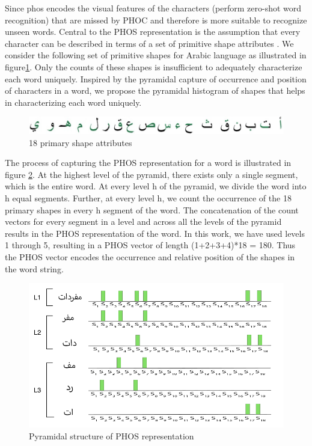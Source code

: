 Since \acrshort{phos} encodes the visual features of the characters (perform zero-shot word recognition) that are missed by PHOC and therefore is more suitable to recognize unseen words. Central to the PHOS representation is the assumption that every character can be described in terms of a set of primitive shape attributes \cite{ZEROSHOT}. We consider the following set of primitive shapes for Arabic language as illustrated in figure\ref{fig:arabic-primary-shape}. Only the counts of these shapes is insufficient to adequately characterize each word uniquely. Inspired by the pyramidal capture of occurrence and position of characters in a word, we propose the pyramidal histogram of shapes that helps in characterizing each word uniquely.

\begin{figure}[!htb]
    \centering
    \includegraphics[width=14cm]{images/arabic-letters.png}
    \caption{18 primary shape attributes}
    \label{fig:arabic-primary-shape}
\end{figure}


The process of capturing the PHOS representation for a word is illustrated in figure \ref{fig:phos-representation}. At the highest level of the pyramid, there exists only a single segment, which is the entire word. At every level h of the pyramid, we divide the word into h equal segments. Further, at every level h, we count the occurrence of the 18 primary shapes in every h segment of the word. The concatenation of the count vectors for every segment in a level and across all the levels of the pyramid results in the PHOS representation of the word. In this work, we have used levels 1 through 5, resulting in a PHOS vector of length (1+2+3+4)*18 = 180. Thus the PHOS vector encodes the occurrence and relative position of the shapes in the word string.

\begin{figure}[!htb]
    \centering
    \includegraphics[width=14cm]{images/phos_representation-arabic.png}
    \caption{Pyramidal structure of PHOS representation}
    \label{fig:phos-representation}
\end{figure}

